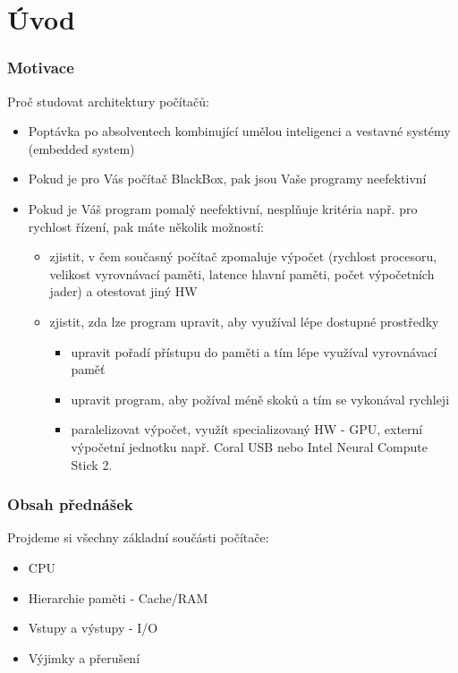 \documentclass{beamer}
\subtitle{Lekce 01. Úvod}
\author{Petr Štěpán\\ \small\texttt{stepan@fel.cvut.cz}}
\begin{document}
\maketitle

\section{Úvod}

\begin{frame}
\frametitle{Motivace}
Proč studovat architektury počítačů:
\begin{itemize}
\item Poptávka po absolventech kombinující umělou inteligenci a vestavné systémy (embedded system)
\item Pokud je pro Vás počítač BlackBox, pak jsou Vaše programy neefektivní
\item Pokud je Váš program pomalý neefektivní, nesplňuje kritéria např. pro rychlost řízení, pak máte několik možností:
\begin{itemize}
  \item zjistit, v čem současný počítač zpomaluje výpočet (rychlost procesoru, velikost vyrovnávací paměti, latence hlavní paměti, počet výpočetních jader) a otestovat jiný HW
  \item zjistit, zda lze program upravit, aby využíval lépe dostupné prostředky 
  \begin{itemize}
    \item upravit pořadí přístupu do paměti a tím lépe využíval vyrovnávací paměť
    \item upravit program, aby požíval méně skoků a tím se vykonával rychleji
    \item paralelizovat výpočet, využít specializovaný HW - GPU, externí výpočetní jednotku např. Coral USB nebo Intel Neural Compute Stick 2.
  \end{itemize}
\end{itemize}
\end{itemize}

\end{frame}


\begin{frame}
\frametitle{Obsah přednášek}
Projdeme si všechny základní součásti počítače:
\begin{itemize}
\item CPU
\item Hierarchie paměti - Cache/RAM
\item Vstupy a výstupy - I/O
\item Výjimky a přerušení
\end{itemize}
\end{frame}
\end{document}
